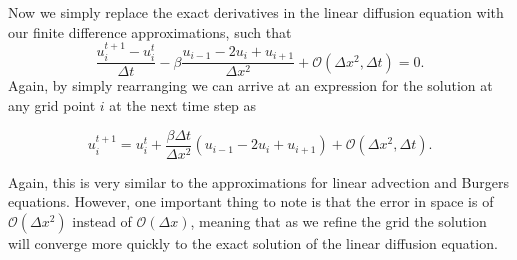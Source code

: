 Now we simply replace the exact derivatives in the linear diffusion equation with our finite difference approximations, such that
\begin{equation}
\frac{u_i^{t+1} - u_{i}^t}{\Delta t} - \beta \frac{u_{i-1} - 2u_i + u_{i+1}}{\Delta x^2} + \mathcal{O}(\Delta x^2,\Delta t) = 0.
\end{equation}
Again, by simply rearranging we can arrive at an expression for the solution at any grid point $i$ at the next time step as
\begin{eqBox}
\begin{equation}
u_i^{t+1}  = u_{i}^t + \frac{\beta \Delta t}{\Delta x^2} \left(u_{i-1} - 2u_i + u_{i+1}\right) + \mathcal{O}(\Delta x^2,\Delta t).
\end{equation}
\end{eqBox}
Again, this is very similar to the approximations for linear advection and Burgers equations. However, one important thing to note is that the error in space is of $\mathcal{O}(\Delta x^2)$ instead of $\mathcal{O}(\Delta x)$, meaning that as we refine the grid the solution will converge more quickly to the exact solution of the linear diffusion equation.

